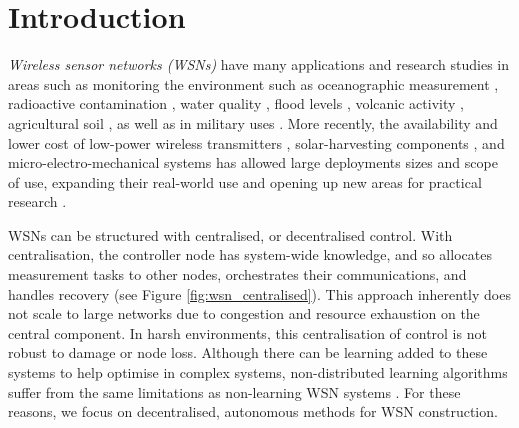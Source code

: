 \section{Introduction}

\ifdefined\DEBUG {} \else \fi
\textit{Wireless sensor networks (WSNs)} have many applications and research studies in areas such as monitoring the environment such as oceanographic measurement \citep{Mahdy2008a, Albaladejo2010, 6973877}, radioactive contamination \citep{Gomez2015}, water quality \citep{Fang2010}, flood levels \citep{Castillo-effen2004}, volcanic activity \citep{Werner-Allen2006}, agricultural soil \citep{8745854}, as well as in military uses \citep{6268958}. More recently, the availability and lower cost of low-power wireless transmitters \citep{902661}, solar-harvesting components \citep{Prauzek2018}, and micro-electro-mechanical systems \citep{1045391} has allowed large deployments sizes and scope of use, expanding their real-world use and opening up new areas for practical research \citep{5597912, Kandris2020}.

\ifdefined\DEBUG {} \else \fi
\ifdefined\DEBUG {} \else \fi
WSNs can be structured with centralised, or decentralised control. With centralisation, the controller node has system-wide knowledge, and so allocates measurement tasks to other nodes, orchestrates their communications, and handles recovery (see Figure \ref{fig:wsn_centralised}). This approach inherently does not scale to large networks due to congestion and resource exhaustion on the central component. In harsh environments, this centralisation of control is not robust to damage or node loss. Although there can be learning added to these systems to help optimise in complex systems, non-distributed learning algorithms suffer from the same limitations as non-learning WSN systems \citep{Imagestate2006}. For these reasons, we focus on decentralised, autonomous methods for WSN construction.

